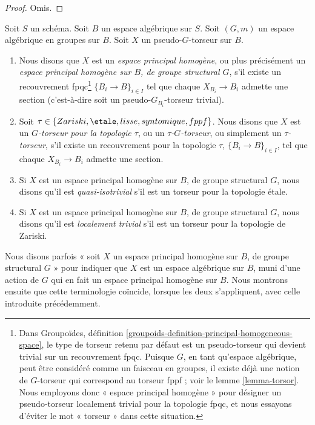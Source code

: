 \begin{proof}
Omis.
\end{proof}

\begin{definition}
\label{definition-principal-homogeneous-space}
Soit $S$ un schéma. Soit $B$ un espace algébrique sur $S$. Soit $(G, m)$ un espace algébrique en groupes sur $B$. Soit $X$ un pseudo-$G$-torseur sur $B$.
\begin{enumerate}
\item Nous disons que $X$ est un {\it espace principal homogène}, ou plus précisément un {\it espace principal homogène sur $B$, de groupe structural $G$}, s'il existe un recouvrement fpqc\footnote{Dans Groupoïdes, définition \ref{groupoids-definition-principal-homogeneous-space}, le type de torseur retenu par défaut est un pseudo-torseur qui devient trivial sur un recouvrement fpqc. Puisque $G$, en tant qu'espace algébrique, peut être considéré comme un faisceau en groupes, il existe déjà une notion de $G$-torseur qui correspond au torseur fppf ; voir le lemme \ref{lemma-torsor}. Nous employons donc « espace principal homogène » pour désigner un pseudo-torseur localement trivial pour la topologie fpqc, et nous essayons d'éviter le mot « torseur » dans cette situation.} $\{B_i \to B\}_{i \in I}$ tel que chaque $X_{B_i} \to B_i$ admette une section (c'est-à-dire soit un pseudo-$G_{B_i}$-torseur trivial).
\item Soit $\tau \in \{Zariski, \etale, lisse, syntomique, fppf\}$. Nous disons que $X$ est un {\it $G$-torseur pour la topologie $\tau$}, ou un {\it $\tau$-$G$-torseur}, ou simplement un {\it $\tau$-torseur}, s'il existe un recouvrement pour la topologie $\tau$, $\{B_i \to B\}_{i \in I}$, tel que chaque $X_{B_i} \to B_i$ admette une section.
\item Si $X$ est un espace principal homogène sur $B$, de groupe structural $G$, nous disons qu'il est {\it quasi-isotrivial} s'il est un torseur pour la topologie étale.
\item Si $X$ est un espace principal homogène sur $B$, de groupe structural $G$, nous disons qu'il est {\it localement trivial} s'il est un torseur pour la topologie de Zariski.
\end{enumerate}
\end{definition}

\noindent
Nous disons parfois « soit $X$ un espace principal homogène sur $B$, de groupe structural $G$ » pour indiquer que $X$ est un espace algébrique sur $B$, muni d'une action de $G$ qui en fait un espace principal homogène sur $B$. Nous montrons ensuite que cette terminologie coïncide, lorsque les deux s'appliquent, avec celle introduite précédemment.

